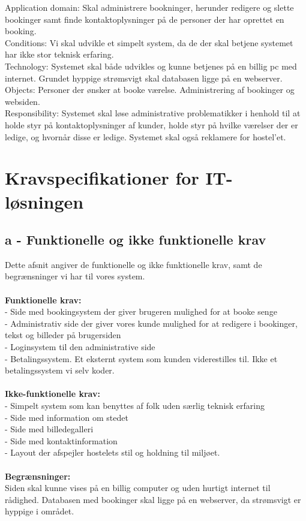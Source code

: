 \documentclass[12pt,a4paper]{article}
\begin{document}
Application domain: Skal administrere bookninger, herunder redigere og slette bookinger samt finde kontaktoplysninger på de personer der har oprettet en booking.\\
 
Conditions:  Vi skal udvikle et simpelt system, da de der skal betjene systemet har ikke stor teknisk erfaring.\\

Technology: Systemet skal både udvikles og kunne betjenes på en billig pc med internet. Grundet hyppige strømsvigt skal databasen ligge på en webserver. \\

Objects: Personer der ønsker at booke værelse. Administrering af bookinger og websiden.\\

Responsibility: Systemet skal løse administrative problematikker i henhold til at holde styr på kontaktoplysninger af kunder, holde styr på hvilke værelser der er ledige, og hvornår disse er ledige. Systemet skal også reklamere for hostel'et.\\
\newpage
\section{Kravspecifikationer for IT-løsningen}
\subsection{a - Funktionelle og ikke funktionelle krav}
Dette afsnit angiver de funktionelle og ikke funktionelle krav, samt de begrænsninger vi har til vores system.\\\\
\textbf{Funktionelle krav:} \\
- Side med bookingsystem der giver brugeren mulighed for at booke senge\\
- Administrativ side der giver vores kunde mulighed for at redigere i bookinger, tekst og billeder på brugersiden\\
- Loginsystem til den administrative side\\
- Betalingssystem. Et eksternt system som kunden viderestilles til. Ikke et betalingssystem vi selv koder.\\\\
       \textbf{Ikke-funktionelle krav:} \\
- Simpelt system som kan benyttes af folk uden særlig teknisk erfaring\\
- Side med information om stedet\\
- Side med billedegalleri\\
- Side med kontaktinformation\\
- Layout der afspejler hostelets stil og holdning til miljøet. \\\\
      \textbf{Begrænsninger:} \\
	Siden skal kunne vises på en billig computer og uden hurtigt internet til rådighed. Databasen med bookinger skal ligge på en webserver, da strømsvigt er hyppige i området.
\newpage
\end{document}
